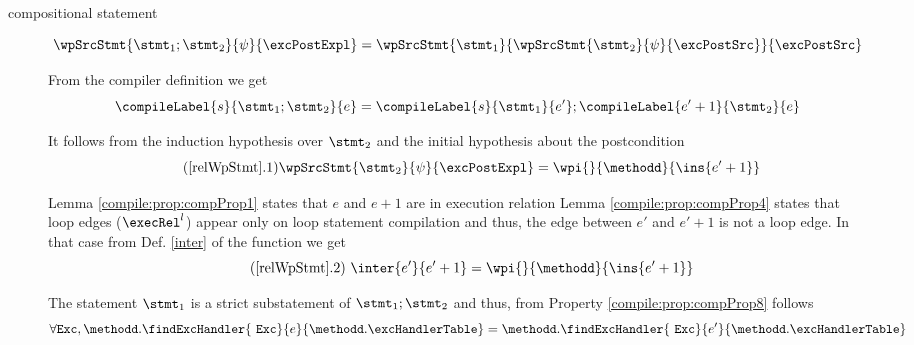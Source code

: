 \begin{description}
       \item[compositional statement]
          
	     \begin{equation*} \wpSrcStmt{  \stmt_1 ;  \stmt_2 }{\psi}{\excPostExpl} = 
	     \wpSrcStmt{\stmt_1 }{\wpSrcStmt{\stmt_2 }{\psi }{ \excPostSrc}} { \excPostSrc} 
	     \end{equation*}
	     
		From the compiler definition we get
                \begin{equation*} \compileLabel{s}{ \stmt_1 ;  \stmt_2}{e} =
	                \compileLabel{s}{\stmt_1}{e'};%
			\compileLabel{e'+1}{\stmt_2}{e} \end{equation*} 
		  

	       It follows from  the induction hypothesis over $\stmt_2$ and the initial hypothesis about the postcondition 
	    \begin{equation*}  \label{pog10} \tag{\ref{relWpStmt}.1}    \wpSrcStmt{  \stmt_2 }{   \psi }{\excPostExpl } = \wpi{}{\methodd}{\ins{e'+1}} \end{equation*}  

	       
	       Lemma \ref{compile:prop:compProp1} states that $e$ and $e+1$ are in execution relation
	      Lemma \ref{compile:prop:compProp4} states that loop edges ($\execRel^{l}$)
	       appear only on loop statement compilation and thus, the edge between  $e'$ and $e' + 1$
	        is not a loop edge. In that case from Def. \ref{inter}  of the function \interOnly{} we get 
	     \begin{equation*} \label{pog11} \tag{\ref{relWpStmt}.2}  \ \inter{e'}{e'+1} = \wpi{}{\methodd}{\ins{e'+1}}  \end{equation*}

	       The statement $\stmt_1$ is a strict substatement of $\stmt_1;\stmt_2$ and thus, from Property  \ref{compile:prop:compProp8} follows
	         \begin{equation*} \forall  \mbox{\rm\texttt{Exc}}, \methodd.\findExcHandler{\mbox{ \rm \texttt{Exc}}  }{e}{\methodd.\excHandlerTable} = 
		                                 \methodd.\findExcHandler{\mbox{ \rm \texttt{Exc}}  }{e'}{\methodd.\excHandlerTable}   \end{equation*}
	       

\end{description}
